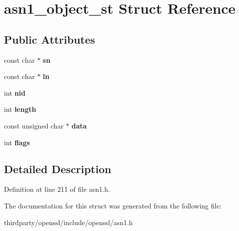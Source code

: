 \hypertarget{structasn1__object__st}{}\section{asn1\+\_\+object\+\_\+st Struct Reference}
\label{structasn1__object__st}
\subsection*{Public Attributes}
\begin{DoxyCompactItemize}
\item 
\mbox{\label{structasn1__object__st_a354a9532f5135bf342293f28af850177}} 
const char $\ast$ {\bfseries sn}
\item 
\mbox{\label{structasn1__object__st_a02d44fa6f642b789372cf8f57f7f0f12}} 
const char $\ast$ {\bfseries ln}
\item 
\mbox{\label{structasn1__object__st_a1506f26770df5e823c217dea262bd64f}} 
int {\bfseries nid}
\item 
\mbox{\label{structasn1__object__st_aebd85f3c9bec7ccf21ce77aa71c78ce1}} 
int {\bfseries length}
\item 
\mbox{\label{structasn1__object__st_a076f159c5190422adbe799dc10aa8ebe}} 
const unsigned char $\ast$ {\bfseries data}
\item 
\mbox{\label{structasn1__object__st_adfe42f89b19fcc6da297e98a54c57ac6}} 
int {\bfseries flags}
\end{DoxyCompactItemize}


\subsection{Detailed Description}


Definition at line 211 of file asn1.\+h.



The documentation for this struct was generated from the following file\+:\begin{DoxyCompactItemize}
\item 
thirdparty/openssl/include/openssl/asn1.\+h\end{DoxyCompactItemize}
